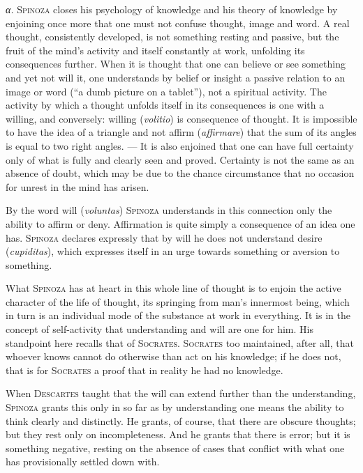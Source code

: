 \documentclass[12pt]{article}
\newcommand{\opage}[1]{\marginnote{\footnotesize\textit{[#1]}}}
\begin{document}
\textit{α.} \textsc{Spinoza} closes his psychology of knowledge and his theory of knowledge
by enjoining once more that one must not confuse thought, image and word. A real thought,
consistently developed, is not something resting and passive, but the fruit of the mind's
activity and itself constantly at work, unfolding its consequences further. When it is thought
that one can believe or see something and yet not will it, one understands by belief or
insight a passive relation to an image or word (``a dumb picture on a tablet''), not a
spiritual activity. The activity by which a thought unfolds itself in its consequences is one
with a willing, and conversely: willing (\textit{volitio}) is consequence of thought. It is
impossible to have the idea of a triangle and not affirm (\textit{affirmare}) that the sum of
its angles is equal to two right angles. --- It is also enjoined that one can have full
certainty only of what is fully and clearly seen and proved. Certainty is not the same as an
absence of doubt, which may be due to the chance circumstance that no occasion for unrest in
the mind has arisen. %

By the word will (\textit{voluntas}) \textsc{Spinoza} understands in this connection only the
ability \opage{55}to affirm or deny. Affirmation is quite simply a consequence of an idea one
has. \textsc{Spinoza} declares expressly that by will he does not understand desire
(\textit{cupiditas}), which expresses itself in an urge towards something or aversion to
something.

What \textsc{Spinoza} has at heart in this whole line of thought is to enjoin the active
character of the life of thought, its springing from man's innermost being, which in turn is
an individual mode of the substance at work in everything. It is in the concept of
self-activity that understanding and will are one for him. His standpoint here recalls that of
\textsc{Socrates}. \textsc{Socrates} too maintained, after all, that whoever knows cannot do
otherwise than act on his knowledge; if he does not, that is for \textsc{Socrates} a proof that %
in reality he had no knowledge. %

When \textsc{Descartes} taught that the will can extend further than the understanding,
\textsc{Spinoza} grants this only in so far as by understanding one means the ability to think
clearly and distinctly. He grants, of course, that there are obscure thoughts; but they rest
only on incompleteness. And he grants that there is error; but it is something negative,
resting on the absence of cases that conflict with what one has provisionally settled down
with.
\end{document}
